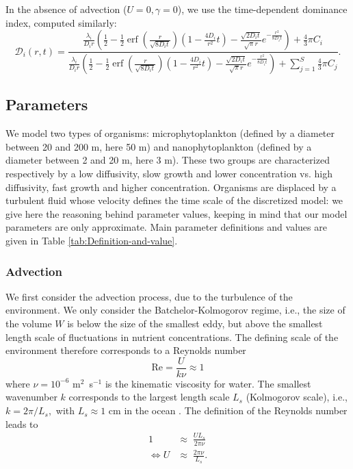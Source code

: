 \documentclass[12pt,english]{article}
\DeclareMathOperator\erf{erf}
\begin{document}
In the absence of advection ($U=0,\gamma=0$), we use the time-dependent
dominance index, computed similarly: 
\begin{equation}
\mathcal{D}_{i}(r,t)=\frac{\frac{\lambda_{i}}{D_{i}r}\left(\frac{1}{2}-\frac{1}{2}\erf\left(\frac{r}{\sqrt{8D_{i}t}}\right)\left(1-\frac{4D_{i}}{r^{2}}t\right)-\frac{\sqrt{2D_{i}t}}{\sqrt{\pi}r}e^{-\frac{r^{2}}{8D_{i}t}}\right)+\frac{4}{3}\pi C_{i}}{\frac{\lambda_{i}}{D_{i}r}\left(\frac{1}{2}-\frac{1}{2}\erf\left(\frac{r}{\sqrt{8D_{i}t}}\right)\left(1-\frac{4D_{i}}{r^{2}}t\right)-\frac{\sqrt{2D_{i}t}}{\sqrt{\pi}r}e^{-\frac{r^{2}}{8D_{i}t}}\right)+\sum_{j=1}^{S}\frac{4}{3}\pi C_{j}}.\label{eq:dom_noadv}
\end{equation}


\subsection*{Parameters}

We model two types of organisms: microphytoplankton (defined by a
diameter between 20 and 200 \textmu m, here 50 \textmu m) and nanophytoplankton
(defined by a diameter between 2 and 20 \textmu m, here 3 \textmu m).
These two groups are characterized respectively by a low diffusivity,
slow growth and lower concentration vs. high diffusivity, fast growth
and higher concentration. Organisms are displaced by a turbulent fluid
whose velocity defines the time scale of the discretized model: we
give here the reasoning behind parameter values, keeping in mind that
our model parameters are only approximate. Main parameter definitions
and values are given in Table \ref{tab:Definition-and-value}.

\subsubsection*{Advection}

We first consider the advection process, due to the turbulence of
the environment. We only consider the Batchelor-Kolmogorov regime,
i.e., the size of the volume $W$ is below the size of the smallest
eddy, but above the smallest length scale of fluctuations in nutrient
concentrations. The defining scale of the environment therefore corresponds
to a Reynolds number 
\begin{equation}
\text{Re}=\frac{U}{k\nu}\approx1\label{eq:reynolds_def}
\end{equation}
where $\nu=10^{-6}$ m$^{2}$~s$^{-1}$ is the kinematic viscosity
for water. The smallest wavenumber $k$ corresponds to the largest
length scale $L_{s}$ (Kolmogorov scale), i.e., $k=2\pi/L_{s},$ with
$L_{s}\approx1$ cm in the ocean \citep{barton_impact_2014}. The
definition of the Reynolds number leads to 
\begin{equation}
\begin{array}{cc}
1 & \approx\;\frac{UL_{s}}{2\pi\nu}\\
\Leftrightarrow U & \approx\;\frac{2\pi\nu}{L_{s}}.
\end{array}\label{eq:compute_U}
\end{equation}
\end{document}
